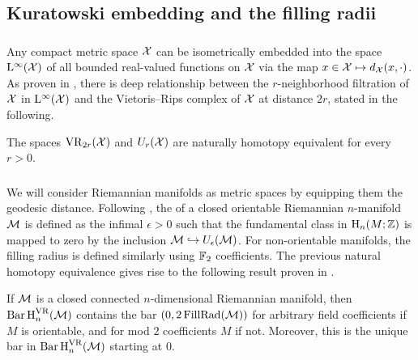

\subsection{Kuratowski embedding and the filling radii}\label{sub:filling radii}

\subsubsection{}\label{ss:kuratowski}

Any compact metric space $\mathcal{X}$ can be isometrically embedded into the space $\mathrm{L}^\infty(\mathcal{X})$ of all bounded real-valued functions on $\mathcal{X}$ via the map $x \in \mathcal{X} \mapsto d_{\mathcal{X}}(x,\cdot)$.
As proven in \cite[Theorem.4.1]{lim2020vietoris}, there is deep relationship between the \(r\)-neighborhood filtration of $\mathcal{X}$ in $\mathrm{L}^\infty(\mathcal{X})$ and the Vietoris--Rips complex of \(\mathcal{X}\) at distance \(2r\), stated in the following.

\medskip\lemma The spaces $\mathrm{VR}_{2r}(\mathcal{X})$ and $U_r(\mathcal{X})$ are naturally homotopy equivalent for every \(r > 0\).

\subsubsection{}\label{ss:filling_radius}

We will consider Riemannian manifolds as metric spaces by equipping them the geodesic distance.
Following \cite{gromov1983filling}, the  of a closed orientable Riemannian $n$-manifold $\mathcal{M}$ is defined as the infimal $\epsilon > 0$ such that the fundamental class in $\mathrm{H}_n(M; \mathbb{Z})$ is mapped to zero by the inclusion $\mathcal{M} \hookrightarrow U_\epsilon(\mathcal{M})$.
For non-orientable manifolds, the filling radius is defined similarly using \({\mathbb{F}_2}\) coefficients.
The previous natural homotopy equivalence gives rise to the following result proven in \cite[Prop.9.28]{lim2020vietoris}.

\medskip\lemma
If $\mathcal{M}$ is a closed connected $n$-dimensional Riemannian manifold, then \(\operatorname{Bar} \operatorname{H}_{n}^{\mathrm{VR}} (\mathcal{M})\) contains the bar \((0,2\operatorname{FillRad}(\mathcal{M}))\) for arbitrary field coefficients if $M$ is orientable, and for mod $2$ coefficients $M$ if not.
Moreover, this is the unique bar in \(\operatorname{Bar} \operatorname{H}_{n}^{\mathrm{VR}} (\mathcal{M})\) starting at $0$.

